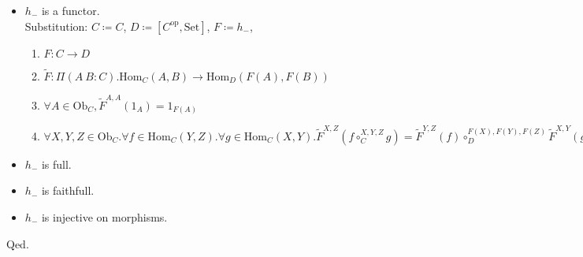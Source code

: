 \documentclass[10pt,a4paper]{article}
\theoremstyle{definition}
\newcommand{\Ob}{{\mbox{Ob}}}
\newcommand{\Hom}{{\mbox{Hom}}}
\newcommand{\FMor}{{\widetilde{F}\mbox{}}}
\newcommand{\op}{{\mbox{op}}}
\newcommand{\Set}{{\mbox{Set}}}
\begin{document}
\begin{itemize}
\item $h_-$ is a functor.\\
Substitution: $C\coloneqq C$, $D\coloneqq [C^\op,\Set]$, $F\coloneqq h_-$,
\begin{enumerate}
\item $F:C \to D$
\item $\FMor:\Pi(A\ B:C).\Hom_C(A,B) \to \Hom_D(F(A), F(B))$
\item $\forall A\in \Ob_C, \FMor^{A,A}(1_A)=1_{F(A)}$
\item $\forall X,Y,Z \in \Ob_C.\forall f\in\Hom_C(Y,Z).\forall g\in\Hom_C(X,Y). \FMor^{X,Z}(f\circ_C^{X,Y,Z} g)=\FMor^{Y,Z}(f)\circ_D^{F(X),F(Y),F(Z)} \FMor^{X,Y}(g)$
\end{enumerate}
\item $h_-$ is full.
\item $h_-$ is faithfull.
\item $h_-$ is injective on morphisms.
\end{itemize}
Qed.\\
\end{document}
